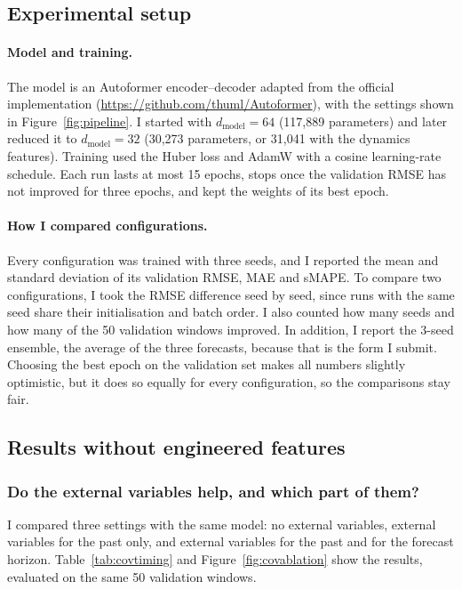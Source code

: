 \documentclass[a4, 12pt]{article}
\begin{document}
\subsection{Experimental setup}
\label{sec:setup}

\paragraph{Model and training.} The model is an Autoformer encoder--decoder adapted from the official implementation (\url{https://github.com/thuml/Autoformer}), with the settings shown in Figure~\ref{fig:pipeline}. I started with $d_{\text{model}} = 64$ (117,889 parameters) and later reduced it to $d_{\text{model}} = 32$ (30,273 parameters, or 31,041 with the dynamics features). Training used the Huber loss and AdamW with a cosine learning-rate schedule. Each run lasts at most 15 epochs, stops once the validation RMSE has not improved for three epochs, and kept the weights of its best epoch.

\paragraph{How I compared configurations.} Every configuration was trained with three seeds, and I reported the mean and standard deviation of its validation RMSE, MAE and sMAPE. To compare two configurations, I took the RMSE difference seed by seed, since runs with the same seed share their initialisation and batch order. I also counted how many seeds and how many of the 50 validation windows improved. In addition, I report the 3-seed ensemble, the average of the three forecasts, because that is the form I submit. Choosing the best epoch on the validation set makes all numbers slightly optimistic, but it does so equally for every configuration, so the comparisons stay fair.

\subsection{Results without engineered features}

\subsubsection{Do the external variables help, and which part of them?}
\label{sec:covtiming}

I compared three settings with the same model: no external variables, external variables for the past only, and external variables for the past and for the forecast horizon. Table~\ref{tab:covtiming} and Figure~\ref{fig:covablation} show the results, evaluated on the same 50 validation windows.
\end{document}
